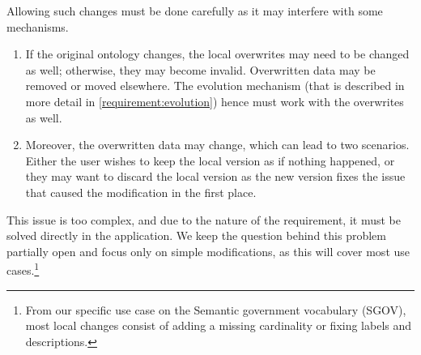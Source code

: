 Allowing such changes must be done carefully as it may interfere with some mechanisms.
\begin{enumerate}
  \item If the original ontology changes, the local overwrites may need to be changed as well; otherwise, they may become invalid. Overwritten data may be removed or moved elsewhere. The evolution mechanism (that is described in more detail in \autoref{requirement:evolution}) hence must work with the overwrites as well.
  \item Moreover, the overwritten data may change, which can lead to two scenarios. Either the user wishes to keep the local version as if nothing happened, or they may want to discard the local version as the new version fixes the issue that caused the modification in the first place.
\end{enumerate}

This issue is too complex, and due to the nature of the requirement, it must be solved directly in the application. We keep the question behind this problem partially open and focus only on simple modifications, as this will cover most use cases.\footnote{From our specific use case on the Semantic government vocabulary (SGOV), most local changes consist of adding a missing cardinality or fixing labels and descriptions.}